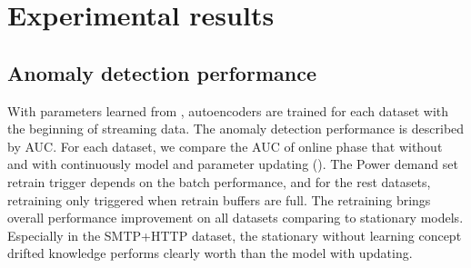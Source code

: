 \chapter{Experimental results}
\label{chap:results}


\section{Anomaly detection performance}
\label{sec:performance}

With parameters learned from , autoencoders are trained for each dataset with the beginning of streaming data. The anomaly detection performance is described by AUC. For each dataset, we compare the AUC of online phase that without and with continuously model and parameter updating (). The Power demand set retrain trigger depends on the batch performance, and for the rest datasets, retraining only triggered when retrain buffers are full. The retraining brings overall performance improvement on all datasets comparing to stationary models. Especially in the SMTP+HTTP dataset, the stationary without learning concept drifted knowledge performs clearly worth than the model with updating.

